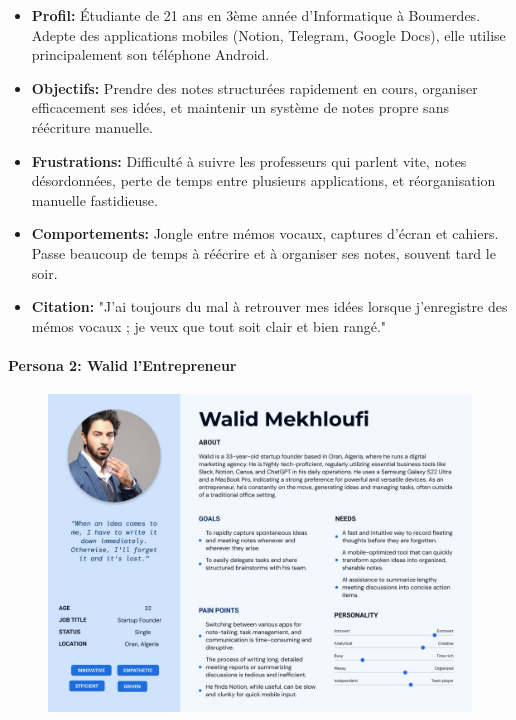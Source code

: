     \begin{itemize}
        \item \textbf{Profil:} Étudiante de 21 ans en 3ème année d'Informatique à Boumerdes. Adepte des applications mobiles (Notion, Telegram, Google Docs), elle utilise principalement son téléphone Android.
        \item \textbf{Objectifs:} Prendre des notes structurées rapidement en cours, organiser efficacement ses idées, et maintenir un système de notes propre sans réécriture manuelle.
        \item \textbf{Frustrations:} Difficulté à suivre les professeurs qui parlent vite, notes désordonnées, perte de temps entre plusieurs applications, et réorganisation manuelle fastidieuse.
        \item \textbf{Comportements:} Jongle entre mémos vocaux, captures d'écran et cahiers. Passe beaucoup de temps à réécrire et à organiser ses notes, souvent tard le soir.
        \item \textbf{Citation:} "J'ai toujours du mal à retrouver mes idées lorsque j'enregistre des mémos vocaux ; je veux que tout soit clair et bien rangé."
    \end{itemize}
    
    \paragraph{Persona 2: Walid l'Entrepreneur}
    
    \begin{figure}[htbp]
        \centering
        \includegraphics[width=\textwidth]{assets/docs/walid-persona.jpg}
    \end{figure}
    
